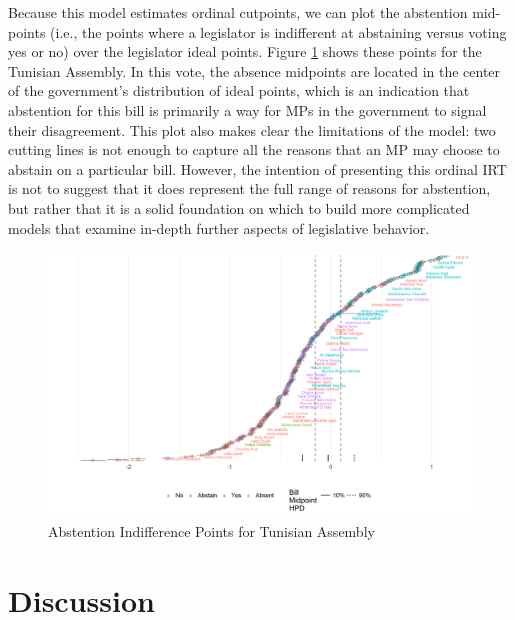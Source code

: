 	Because this model estimates ordinal cutpoints, we can plot the abstention mid-points (i.e., the points where a legislator is indifferent at abstaining versus voting yes or no) over the legislator ideal points. Figure \ref{tunis_abst} shows these points for the Tunisian Assembly. In this vote, the absence midpoints are located in the center of the government's distribution of ideal points, which is an indication that abstention for this bill is primarily a way for MPs in the government to signal their disagreement. This plot also makes clear the limitations of the model: two cutting lines is not enough to capture all the reasons that an MP may choose to abstain on a particular bill. However, the intention of presenting this ordinal IRT is not to suggest that it does represent the full range of reasons for abstention, but rather that it is a solid foundation on which to build more complicated models that examine in-depth further aspects of legislative behavior.
		\begin{figure}
		\centering
		\caption{Abstention Indifference Points for Tunisian Assembly}\label{tunis_abst}
		\includegraphics[width=\linewidth]{tunisia_abstain}
	\end{figure}
	
	\section{Discussion}
	
